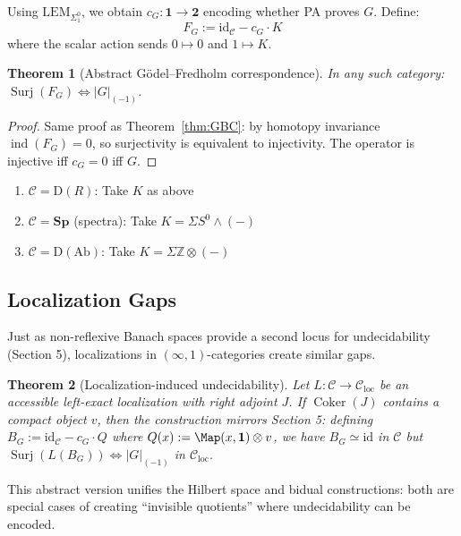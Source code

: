 \documentclass[11pt]{article}
\newtheorem{theorem}{Theorem}[section]
\theoremstyle{definition}
\newcommand{\SigOne}{\Sigma^{0}_{\!1}}
\newcommand{\bool}{\mathbf{2}}
\DeclareMathOperator{\Coker}{Coker}
\DeclareMathOperator{\Surj}{Surj}
\DeclareMathOperator{\ind}{ind}
\newcommand{\trunc}[1]{\lvert #1\rvert_{(-1)}}
\begin{document}
Using $\text{LEM}_{\SigOne}$, we obtain $c_G: \mathbf{1} \to \bool$ encoding whether PA proves $G$. Define:
\[
F_G := \mathrm{id}_{\mathcal{C}} - c_G \cdot K
\]
where the scalar action sends $0 \mapsto 0$ and $1 \mapsto K$.

\begin{theorem}[Abstract Gödel--Fredholm correspondence]
In any such category: $\Surj(F_G) \iff \trunc{G}$.
\end{theorem}
\begin{proof}
Same proof as Theorem~\ref{thm:GBC}: by homotopy invariance $\ind(F_G) = 0$, so surjectivity is equivalent to injectivity. The operator is injective iff $c_G = 0$ iff $G$.
\end{proof}

\begin{examples}
\begin{enumerate}
\item $\mathcal{C} = \mathrm{D}(R)$: Take $K$ as above
\item $\mathcal{C} = \mathbf{Sp}$ (spectra): Take $K = \Sigma S^0 \wedge (-)$
\item $\mathcal{C} = \mathrm{D}(\mathrm{Ab})$: Take $K = \Sigma \mathbb{Z} \otimes (-)$
\end{enumerate}
\end{examples}

\subsection{Localization Gaps}

Just as non-reflexive Banach spaces provide a second locus for undecidability (Section 5), localizations in $(\infty,1)$-categories create similar gaps.

\begin{theorem}[Localization-induced undecidability]
Let $L: \mathcal{C} \to \mathcal{C}_{\mathrm{loc}}$ be an accessible left-exact localization with right adjoint $J$. If $\Coker(J)$ contains a compact object $v$, then the construction mirrors Section 5: defining $B_G := \mathrm{id}_{\mathcal{C}} - c_G \cdot Q$ where $Q(x) := \Map(x,\mathbf{1}) \otimes v$, we have $B_G \simeq \mathrm{id}$ in $\mathcal{C}$ but $\Surj(L(B_G)) \iff \trunc{G}$ in $\mathcal{C}_{\mathrm{loc}}$.
\end{theorem}

This abstract version unifies the Hilbert space and bidual constructions: both are special cases of creating ``invisible quotients'' where undecidability can be encoded.
\end{document}
